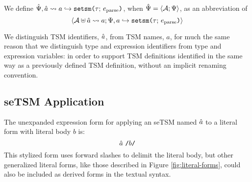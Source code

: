 \begin{enumerate}
We define $\hat{\Psi}, \hat{a} \leadsto a \hookrightarrow \texttt{setsm}\texttt{(}\tau;\,e_\text{parse}\texttt{)}$, when $\hat{\Psi}=\langle \mathcal{A}; \Psi \rangle$, as an abbreviation of \[\langle \mathcal{A} \uplus \hat{a} \leadsto a; \Psi, a \hookrightarrow \texttt{setsm}\texttt{(}\tau;\,e_\text{parse}\texttt{)} \rangle\]

We distinguish TSM identifiers, $\hat{a}$, from TSM names, $a$, for much the same reason that we distinguish type and expression identifiers from type and expression variables: in order to support TSM definitions identified in the same way as a previously defined TSM definition, without an implicit renaming convention. %

\end{enumerate}



\subsection{seTSM Application}\label{sec:U-uetsm-application}
The unexpanded expression form for applying an seTSM named $\hat{a}$ to a literal form with literal body $b$ is:
\[
\hat{a}~\texttt{/}b\texttt{/}
\] 
This stylized form uses forward slashes to delimit the literal body, but other generalized literal forms, like those described in Figure \ref{fig:literal-forms}, could also be included as derived forms in the textual syntax. %

